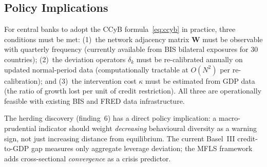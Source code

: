 \documentclass[11pt]{article}
\theoremstyle{definition}
\begin{document}
\subsection{Policy Implications}

For central banks to adopt the CCyB formula~\eqref{eq:ccyb} in practice, three
conditions must be met: (1)~the network adjacency matrix $\mathbf{W}$ must be
observable with quarterly frequency (currently available from BIS bilateral
exposures for 30 countries); (2)~the deviation operators $\delta_k$ must be
re-calibrated annually on updated normal-period data (computationally tractable
at $O(N^2)$ per re-calibration); and (3)~the intervention cost $\kappa$ must be
estimated from GDP data (the ratio of growth lost per unit of credit restriction).
All three are operationally feasible with existing BIS and FRED data infrastructure.

The herding discovery (finding~6) has a direct policy implication: a macro-prudential
indicator should weight \emph{decreasing} behavioural diversity as a warning sign,
not just increasing distance from equilibrium.  The current Basel~III credit-to-GDP
gap measures only aggregate leverage deviation; the MFLS framework adds
cross-sectional \emph{convergence} as a crisis predictor.
\end{document}
